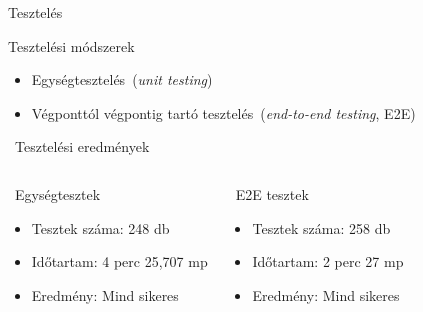 \documentclass[aspectratio=169, 11pt]{beamer}
\begin{document}
\begin{frame}{Tesztelés}
    \begin{block}{Tesztelési módszerek}
        \begin{itemize}
            \vspace{0.5em}
            \item Egységtesztelés~(\textit{unit testing})
            \vspace{0.5em}
            \item Végponttól végpontig tartó tesztelés~(\textit{end-to-end testing}, \textsc{E2E})
            \vspace{0.5em}
        \end{itemize}
    \end{block}
    \begin{block}{\faChartBar~Tesztelési eredmények}
        \vspace{-1em}
        \begin{columns}[t]
            \begin{block}{\faFileCode~Egységtesztek}
              \begin{itemize}
                \vspace{0.5em}
                \item Tesztek száma: \textcolor{secondary}{248} db
                \vspace{0.5em}
                \item Időtartam: \textcolor{secondary}{4} perc \textcolor{secondary}{25,707} mp
                \vspace{0.5em}
                \item Eredmény: \textcolor{secondary}{Mind sikeres}
                \vspace{0.5em}
              \end{itemize}
            \end{block}
            \begin{block}{\faGlobe~E2E tesztek}
              \begin{itemize}
                \vspace{0.5em}
                \item Tesztek száma: \textcolor{secondary}{258} db
                \vspace{0.5em}
                \item Időtartam: \textcolor{secondary}{2} perc \textcolor{secondary}{27} mp
                \vspace{0.5em}
                \item Eredmény: \textcolor{secondary}{Mind sikeres}
                \vspace{0.5em}
              \end{itemize}
            \end{block}
        \end{columns}
    \end{block}


\end{frame}
\end{document}

